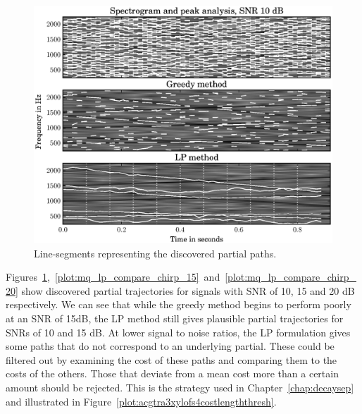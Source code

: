 \begin{figure}[!t]
    \includegraphics[width=\textwidth]{plots/mq_lp_compare_chirp_10.eps}
    \caption{ Line-segments representing the discovered partial paths.
    \label{plot:mq_lp_compare_chirp_10}}
\end{figure}
Figures~\ref{plot:mq_lp_compare_chirp_10},~\ref{plot:mq_lp_compare_chirp_15}~and~\ref{plot:mq_lp_compare_chirp_20}
show discovered partial trajectories for signals with SNR of 10, 15 and 20 dB
respectively. We can see that while the greedy method begins to perform poorly
at an SNR of 15dB, the LP method still gives plausible partial trajectories for
SNRs of 10 and 15 dB. At lower signal to noise ratios, the LP formulation gives
some paths that do not correspond to an underlying partial. These could be filtered
out by examining the cost of these paths and comparing them to the costs of the
others. Those that deviate from a mean cost more than a certain amount should be
rejected. This is the strategy used in Chapter~\ref{chap:decaysep} and
illustrated in Figure~\ref{plot:acgtra3xylofs4costlengththresh}.

